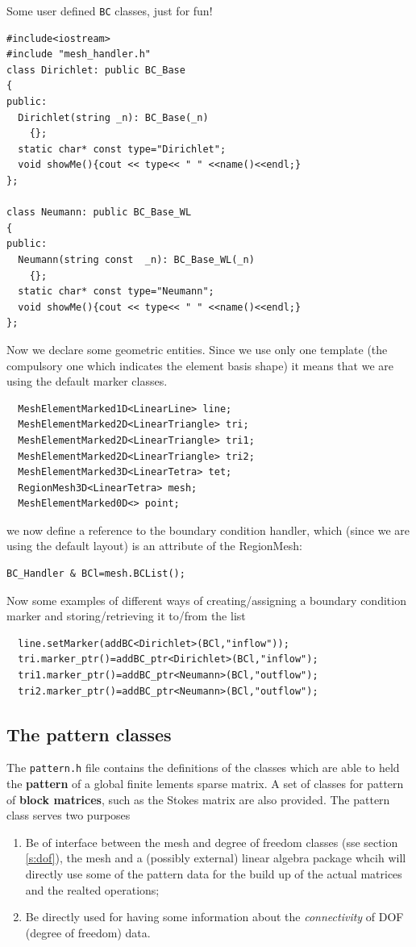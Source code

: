 Some user defined \texttt{BC} classes, just for fun!
\begin{verbatim}
#include<iostream>
#include "mesh_handler.h"
class Dirichlet: public BC_Base
{
public:
  Dirichlet(string _n): BC_Base(_n)
    {};
  static char* const type="Dirichlet";
  void showMe(){cout << type<< " " <<name()<<endl;}
};

class Neumann: public BC_Base_WL
{
public:
  Neumann(string const  _n): BC_Base_WL(_n)
    {};
  static char* const type="Neumann";
  void showMe(){cout << type<< " " <<name()<<endl;}
};
\end{verbatim}
Now we declare some geometric entities. Since we use only one
template (the compulsory one which indicates the element basis shape) it
means that we are using the default marker classes.
\begin{verbatim}
  MeshElementMarked1D<LinearLine> line;
  MeshElementMarked2D<LinearTriangle> tri;
  MeshElementMarked2D<LinearTriangle> tri1;
  MeshElementMarked2D<LinearTriangle> tri2;
  MeshElementMarked3D<LinearTetra> tet;
  RegionMesh3D<LinearTetra> mesh;
  MeshElementMarked0D<> point;
\end{verbatim}

we now define a reference to the boundary condition handler,
which (since we are using the default layout) is an attribute of the
RegionMesh:
\begin{verbatim}
BC_Handler & BCl=mesh.BCList();
\end{verbatim}

Now some examples of different ways of creating/assigning a boundary condition
marker and storing/retrieving  it to/from  the list
\begin{verbatim}
  line.setMarker(addBC<Dirichlet>(BCl,"inflow"));
  tri.marker_ptr()=addBC_ptr<Dirichlet>(BCl,"inflow");
  tri1.marker_ptr()=addBC_ptr<Neumann>(BCl,"outflow");
  tri2.marker_ptr()=addBC_ptr<Neumann>(BCl,"outflow");
\end{verbatim}
\subsection{The pattern classes}
\label{s:pattern}
The \texttt{pattern.h} file contains the definitions of the classes
which are able to held the \textbf{pattern} of a global finite lements
sparse matrix. A set of classes for pattern of \textbf{block matrices},
such as the Stokes matrix are also provided. The pattern class serves
two purposes
\begin{enumerate}
\item Be of interface between the mesh and degree of freedom classes
  (sse section \ref{s:dof}), the mesh and a (possibly external) linear
  algebra package whcih will directly use some of the  pattern data for
  the build up of the actual matrices and the realted operations;
\item Be directly used for having some information about the
  \textit{connectivity} of DOF (degree of freedom) data.
\end{enumerate}

